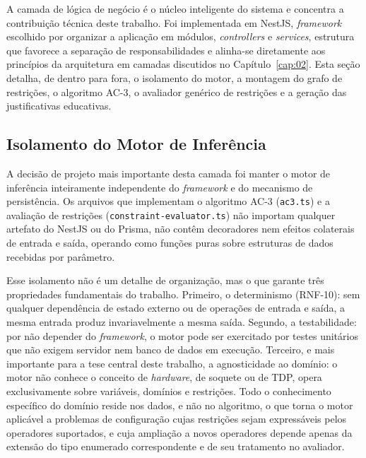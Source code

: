 A camada de lógica de negócio é o núcleo inteligente do sistema e concentra a contribuição técnica deste trabalho. Foi implementada em NestJS, \textit{framework} escolhido por organizar a aplicação em módulos, \textit{controllers} e \textit{services}, estrutura que favorece a separação de responsabilidades e alinha-se diretamente aos princípios da arquitetura em camadas discutidos no Capítulo~\ref{cap:02}. Esta seção detalha, de dentro para fora, o isolamento do motor, a montagem do grafo de restrições, o algoritmo AC-3, o avaliador genérico de restrições e a geração das justificativas educativas.

\subsection{Isolamento do Motor de Inferência}
\label{sub:isolamento-motor}
A decisão de projeto mais importante desta camada foi manter o motor de inferência inteiramente independente do \textit{framework} e do mecanismo de persistência. Os arquivos que implementam o algoritmo AC-3 (\texttt{ac3.ts}) e a avaliação de restrições (\texttt{constraint-evaluator.ts}) não importam qualquer artefato do NestJS ou do Prisma, não contêm decoradores nem efeitos colaterais de entrada e saída, operando como funções puras sobre estruturas de dados recebidas por parâmetro.

Esse isolamento não é um detalhe de organização, mas o que garante três propriedades fundamentais do trabalho. Primeiro, o determinismo (RNF-10): sem qualquer dependência de estado externo ou de operações de entrada e saída, a mesma entrada produz invariavelmente a mesma saída. Segundo, a testabilidade: por não depender do \textit{framework}, o motor pode ser exercitado por testes unitários que não exigem servidor nem banco de dados em execução. Terceiro, e mais importante para a tese central deste trabalho, a agnosticidade ao domínio: o motor não conhece o conceito de \textit{hardware}, de soquete ou de TDP, opera exclusivamente sobre variáveis, domínios e restrições. Todo o conhecimento específico do domínio reside nos dados, e não no algoritmo, o que torna o motor aplicável a problemas de configuração cujas restrições sejam expressáveis pelos operadores suportados, e cuja ampliação a novos operadores depende apenas da extensão do tipo enumerado correspondente e de seu tratamento no avaliador.

